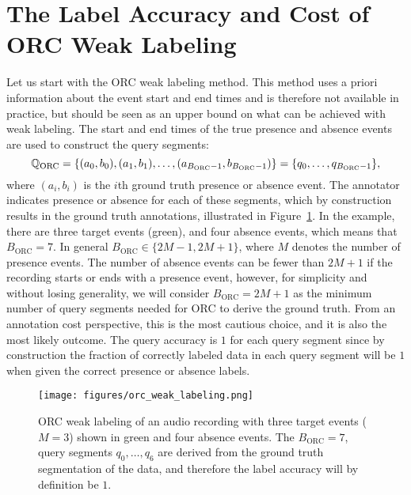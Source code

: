 \section{The Label Accuracy and Cost of ORC Weak Labeling}
Let us start with the ORC weak labeling method. This method uses a priori information about the event start and end times and is therefore not available in practice, but should be seen as an upper bound on what can be achieved with weak labeling. The start and end times of the true presence and absence events are used to construct the query segments:
\begin{equation}
\label{eq:orc}
    {\mathbb{Q}}_{\text{ORC}} = \{(a_0, b_0), (a_1, b_1), \dots, (a_{B_{\text{ORC}}-1}, b_{B_{\text{ORC}}-1})\} = \{q_0, \dots, q_{B_{\text{ORC}}-1}\},
\end{equation}
where $(a_i, b_i)$ is the $i$th ground truth presence or absence event. The annotator indicates presence or absence for each of these segments, which by construction results in the ground truth annotations, illustrated in Figure~\ref{fig:orc_weak_labeling}. In the example, there are three target events (green), and four absence events, which means that $B_{\text{ORC}}=7$. In general $B_{\text{ORC}}\in\{2M-1, 2M+1\}$, where $M$ denotes the number of presence events. The number of absence events can be fewer than $2M+1$ if the recording starts or ends with a presence event, however, for simplicity and without losing generality, we will consider $B_{\text{ORC}}=2M+1$ as the minimum number of query segments needed for ORC to derive the ground truth. From an annotation cost perspective, this is the most cautious choice, and it is also the most likely outcome. The query accuracy is $1$ for each query segment since by construction the fraction of correctly labeled data in each query segment will be $1$ when given the correct presence or absence labels.

\begin{figure}[H]
    \centering
    \texttt{[image: figures/orc\_weak\_labeling.png]}
    \caption{ORC weak labeling of an audio recording with three target events ($M=3$) shown in green and four absence events. The $B_{\text{ORC}}=7$, query segments $q_0, \dots, q_6$ are derived from the ground truth segmentation of the data, and therefore the label accuracy will by definition be $1$.} %
    \label{fig:orc_weak_labeling}
\end{figure}

